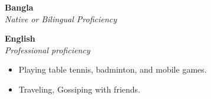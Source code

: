 \smallskip

\textbf{Bangla}\\
\small{\emph{Native or Bilingual Proficiency}}

\smallskip
\smallskip

\textbf{English}\\
\small{\emph{Professional proficiency}}
\smallskip



\smallskip
\begin{itemize}
	\item Playing table tennis, badminton, and mobile games.
	      \smallskip
	\item Traveling, Gossiping with friends.
\end{itemize}